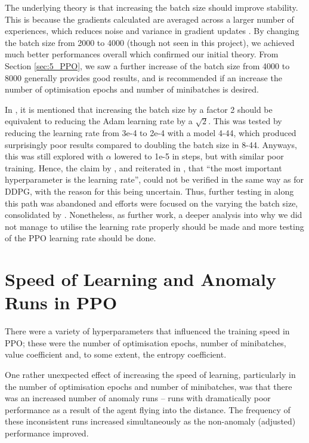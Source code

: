 The underlying theory is that increasing the batch size should improve stability. This is because the gradients calculated are averaged across a larger number of experiences, which reduces noise and variance in gradient updates \cite{batchsizeInvariance}.
By changing the batch size from 2000 to 4000 (though not seen in this project), we achieved much better performances overall which confirmed our initial theory. From Section \ref{sec:5_PPO}, we saw a further increase of the batch size from 4000 to 8000 generally provides good results, and is recommended if an increase the number of optimisation epochs and number of minibatches is desired.

In \cite{batchsizeInvariance}, it is mentioned that increasing the batch size by a factor 2 should be equivalent to reducing the Adam learning rate by a $\sqrt{2}$. This was tested by reducing the learning rate from 3e-4 to 2e-4 with a model 4-44, which produced surprisingly poor results compared to doubling the batch size in 8-44. Anyways, this was still explored with $\alpha$ lowered to 1e-5 in steps, but with similar poor training. Hence, the claim by \cite{DeepLearningBook}, and reiterated in \cite{batchsizeInvariance}, that ``the most important hyperparameter is the learning rate'', could not be verified in the same way as for DDPG, with the reason for this being uncertain. Thus, further testing in along this path was abandoned and efforts were focused on the varying the batch size, consolidated by \cite{dontdecayLRIncreaseBatch}. Nonetheless, as further work, a deeper analysis into why we did not manage to utilise the learning rate properly should be made and more testing of the PPO learning rate should be done.


\section{Speed of Learning and Anomaly Runs in PPO}
\label{sec:6_speed_of_learning_anomaly_runs}
There were a variety of hyperparameters that influenced the training speed in PPO; these were the number of optimisation epochs, number of minibatches, value coefficient and, to some extent, the entropy coefficient. 

One rather unexpected effect of increasing the speed of learning, particularly in the number of optimisation epochs and number of minibatches, was that there was an increased number of anomaly runs -- runs with dramatically poor performance as a result of the agent flying into the distance. The frequency of these inconsistent runs increased simultaneously as the non-anomaly (adjusted) performance improved.

